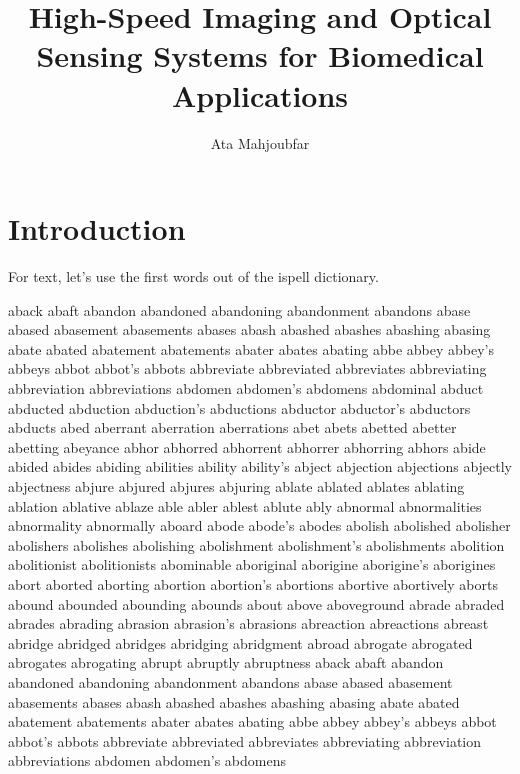 \documentclass [PhD] {uclathes}
\title          {High-Speed Imaging and Optical Sensing Systems for Biomedical Applications}
\author         {Ata Mahjoubfar}
\begin{document}
\makeintropages

%
%

\chapter{Introduction}

For text, let's use the first words out of the ispell dictionary.

aback
abaft
abandon
abandoned
abandoning
abandonment
abandons
abase
abased
abasement
abasements
abases
abash
abashed
abashes
abashing
abasing
abate
abated
abatement
abatements
abater
abates
abating
abbe
abbey
abbey's
abbeys
abbot
abbot's
abbots
abbreviate
abbreviated
abbreviates
abbreviating
abbreviation
abbreviations
abdomen
abdomen's
abdomens
abdominal
abduct
abducted
abduction
abduction's
abductions
abductor
abductor's
abductors
abducts
abed
aberrant
aberration
aberrations
abet
abets
abetted
abetter
abetting
abeyance
abhor
abhorred
abhorrent
abhorrer
abhorring
abhors
abide
abided
abides
abiding
abilities
ability
ability's
abject
abjection
abjections
abjectly
abjectness
abjure
abjured
abjures
abjuring
ablate
ablated
ablates
ablating
ablation
ablative
ablaze
able
abler
ablest
ablute
ably
abnormal
abnormalities
abnormality
abnormally
aboard
abode
abode's
abodes
abolish
abolished
abolisher
abolishers
abolishes
abolishing
abolishment
abolishment's
abolishments
abolition
abolitionist
abolitionists
abominable
aboriginal
aborigine
aborigine's
aborigines
abort
aborted
aborting
abortion
abortion's 
abortions
abortive
abortively
aborts
abound
abounded
abounding
abounds
about
above
aboveground
abrade
abraded
abrades
abrading
abrasion
abrasion's
abrasions
abreaction
abreactions
abreast
abridge
abridged
abridges
abridging
abridgment
abroad
abrogate
abrogated
abrogates
abrogating
abrupt
abruptly
abruptness
aback
abaft
abandon
abandoned
abandoning
abandonment
abandons
abase
abased
abasement
abasements
abases
abash
abashed
abashes
abashing
abasing
abate
abated
abatement
abatements
abater
abates
abating
abbe
abbey
abbey's
abbeys
abbot
abbot's
abbots
abbreviate
abbreviated
abbreviates
abbreviating
abbreviation
abbreviations
abdomen
abdomen's
abdomens
\end{document}
